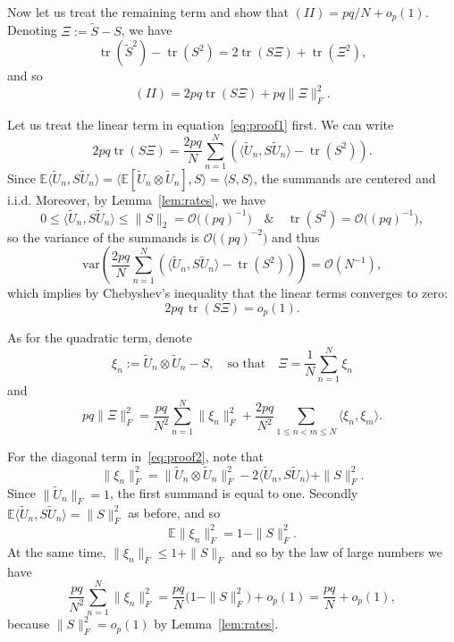 \documentclass[12pt]{article}
\newcommand{\E}{\mathbb{E}}
\newcommand{\tr}{\operatorname{tr}}
\begin{document}
Now let us treat the remaining term and show that $(II)=pq/N + o_p(1)$. Denoting $\Xi := \widetilde S - S$, we have
\[
\tr(\widetilde S^2)-\tr(S^2)
=
2\tr(S \Xi)+\tr(\Xi^2),
\]
and so
\begin{equation}\label{eq:proof1}
(II)
=
2pq\tr(S \Xi)+pq\|\Xi\|_F^2.
\end{equation}

Let us treat the linear term in equation~\eqref{eq:proof1} first. We can write
\[
2pq\tr(S \Xi) = \frac{2pq}{N} \sum_{n=1}^N \left( \langle \widetilde{U}_n, S \widetilde{U}_n\rangle - \tr(S^2)\right).
\]
Since $\E \langle \widetilde{U}_n, S \widetilde{U}_n\rangle = \langle \E[\widetilde{U}_n \otimes \widetilde{U}_n], S \rangle=\langle S, S \rangle$, the summands are centered and i.i.d. Moreover, by Lemma~\ref{lem:rates}, we have
\[
0\leq \langle \widetilde{U}_n, S \widetilde{U}_n\rangle \leq \|S\|_{2}=\mathcal O\big((pq)^{-1}\big)
\quad \& \quad
\tr(S^2)=\mathcal O\big((pq)^{-1}\big),
\]
so the variance of the summands is $\mathcal{O}\big( (pq)^{-2} \big)$ and thus
\[
\mathrm{var}\left(
\frac{2pq}{N} \sum_{n=1}^N \left( \langle \widetilde{U}_n, S \widetilde{U}_n\rangle - \tr(S^2)\right)
\right)
=
\mathcal O(N^{-1}),
\]
which implies by Chebyshev's inequality that the linear terms converges to zero:
\[
	2pq\,\tr(S\Xi)=o_p(1).
\]

As for the quadratic term, denote
\[
\xi_n := \widetilde U_n \otimes \widetilde U_n - S, \quad \text{so that} \quad \Xi = \frac{1}{N}\sum_{n=1}^N \xi_n
\]
and
\begin{equation}\label{eq:proof2}
pq\|\Xi\|_F^2
=
\frac{pq}{N^2}\sum_{n=1}^N \|\xi_n\|_F^2
+
\frac{2pq}{N^2}\sum_{1\le n<m\le N}\langle \xi_n, \xi_m \rangle.
\end{equation}

For the diagonal term in~\eqref{eq:proof2}, note that
\[
\| \xi_n \|_F^2 = \| \widetilde U_n \otimes \widetilde U_n \|_F^2 - 2 \langle \widetilde U_n, S \widetilde U_n \rangle + \| S \|_F^2.
\]
Since $\|\widetilde U_n\|_F=1$, the first summand is equal to one. Secondly $\E \langle \widetilde U_n, S \widetilde U_n \rangle = \|S\|_F^2$ as before, and so
\[
\E\|\xi_n\|_F^2=1-\|S\|_F^2.
\]
At the same time, $\| \xi_n \|_F \leq 1 + \|S\|_F$ and so by the law of large numbers we have
\[
\frac{pq}{N^2}\sum_{n=1}^N \|\xi_n\|_F^2
	=
	\frac{pq}{N}\bigl(1-\|S\|_F^2\bigr)+o_p(1)
	=
	\frac{pq}{N}+o_p(1),
\]
because $\|S\|_F^2 = o_p(1)$ by Lemma~\ref{lem:rates}.
\end{document}
